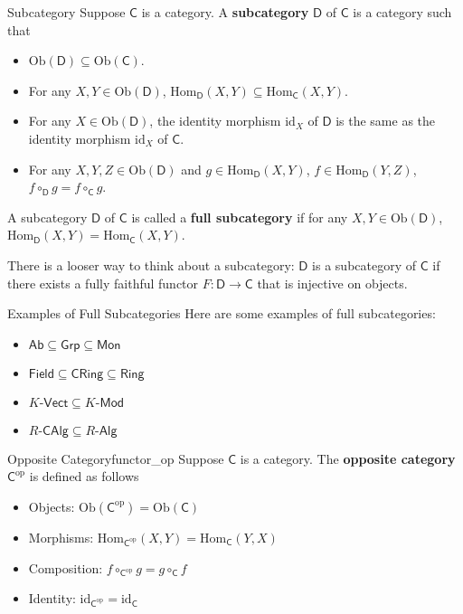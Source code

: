 \begin{definition}{Subcategory}{}
    Suppose $\mathsf{C}$ is a category. A \textbf{subcategory} $\mathsf{D}$ of $\mathsf{C}$ is a category such that
    \begin{itemize}
        \item $\mathrm{Ob}(\mathsf{D})\subseteq \mathrm{Ob}(\mathsf{C})$.
        \item For any $X,Y\in \mathrm{Ob}(\mathsf{D})$, $\mathrm{Hom}_{\mathsf{D}}(X,Y)\subseteq \mathrm{Hom}_{\mathsf{C}}(X,Y)$.
        \item For any $X\in \mathrm{Ob}(\mathsf{D})$, the identity morphism $\mathrm{id}_X$ of $\mathsf{D}$ is the same as the identity morphism $\mathrm{id}_X$ of $\mathsf{C}$.
        \item For any $X,Y,Z\in \mathrm{Ob}(\mathsf{D})$ and  $g\in\mathrm{Hom}_{\mathsf{D}}\left(X,Y\right)$, $f\in\mathrm{Hom}_{\mathsf{D}}\left(Y,Z\right)$, $f\circ_{\mathsf{D}}g=f\circ_{\mathsf{C}}g$.
    \end{itemize}
    A subcategory $\mathsf{D}$ of $\mathsf{C}$ is called a \textbf{full subcategory} if for any $X,Y\in \mathrm{Ob}(\mathsf{D})$, $\mathrm{Hom}_{\mathsf{D}}(X,Y)= \mathrm{Hom}_{\mathsf{C}}(X,Y)$.
\end{definition}

There is a looser way to think about a subcategory: $\mathsf{D}$ is a subcategory of $\mathsf{C}$ if there exists a fully faithful functor $F:\mathsf{D}\to \mathsf{C}$ that is injective on objects.\\

\begin{example}{Examples of Full Subcategories}{}
    Here are some examples of full subcategories:
    \begin{itemize}
        \item $\mathsf{Ab}\subseteq\mathsf{Grp}\subseteq\mathsf{Mon}$
        \item $\mathsf{Field}\subseteq\mathsf{CRing}\subseteq\mathsf{Ring}$
        \item $K\text{-}\mathsf{Vect}\subseteq K\text{-}\mathsf{Mod}$
        \item $R\text{-}\mathsf{CAlg}\subseteq R\text{-}\mathsf{Alg}$
    \end{itemize}
\end{example}


\begin{definition}{Opposite Category}{functor_op}
    Suppose $\mathsf{C}$ is a category. The \textbf{opposite category} $\mathsf{C}^{\mathrm{op}}$ is defined as follows
    \begin{itemize}
        \item Objects: $\mathrm{Ob}(\mathsf{C}^{\mathrm{op}})=\mathrm{Ob}(\mathsf{C})$
        \item Morphisms: $\mathrm{Hom}_{\mathsf{C}^{\mathrm{op}}}(X,Y)=\mathrm{Hom}_{\mathsf{C}}(Y,X)$
        \item Composition: $f\circ_{\mathsf{C}^{\mathrm{op}}}g=g\circ_{\mathsf{C}}f$
        \item Identity: $\mathrm{id}_{\mathsf{C}^{\mathrm{op}}}=\mathrm{id}_{\mathsf{C}}$
    \end{itemize}
\end{definition}

